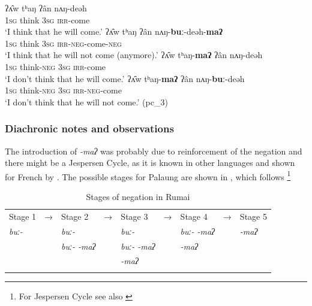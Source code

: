 \documentclass[output=paper,colorlinks,citecolor=brown]{langscibook}
\begin{document}
\ea\label{ex:rum:77}
    \ea\label{ex:rum:77a}
        \gll ʔʌ̂w	tʰaŋ	ʔân	nʌŋ-deəh \\ 
             \textsc{1sg} think 3\textsc{sg} \textsc{irr}{}-come \\
        \glt ‘I think that he will come.’
    \ex\label{ex:rum:77b}
        \gll ʔʌ̂w	tʰaŋ	ʔân	nʌŋ-\textbf{buː}-deəh-\textbf{maʔ} \\
             \textsc{1sg} think \textsc{3sg} \textsc{irr}{}-\textsc{neg}{}-come-\textsc{neg} \\
        \glt ‘I think that he will not come (anymore).’
    \ex\label{ex:rum:77c}
        \gll ʔʌ̂w	tʰaŋ-\textbf{maʔ}	ʔân	nʌŋ-deəh \\
             \textsc{1sg} think-\textsc{neg} \textsc{3sg} \textsc{irr}{}-come \\
        \glt ‘I don’t think that he will come.’
    \ex\label{ex:rum:77d}
        \gll ʔʌ̂w	tʰaŋ-\textbf{maʔ}	ʔân	nʌŋ-\textbf{buː}-deəh \\
             \textsc{1sg} think-\textsc{neg} \textsc{3sg} \textsc{irr}{}-\textsc{neg}{}-come \\
        \glt ‘I don’t think that he will not come.’ (pc\_3)
    \z
\z 

\subsubsection{Diachronic notes and observations} \label{sec:rum:4.6.2}

The introduction of \textit{{}-maʔ} was probably due to reinforcement of the negation and there might be a Jespersen Cycle, as it is known in other languages and shown for French by \citet[78--79]{Auwera2010}. The possible stages for Palaung are shown in , which follows \citet[79]{Auwera2010}\footnote{For Jespersen Cycle see also \citet{Jespersen2025}}

\begin{table}
\begin{tabularx}{\textwidth}{Xllllllll}
\lsptoprule
{Stage 1}       & {→} & {Stage 2}               & {→} & {Stage 3}             & {→} & {Stage 4}              & {→}   & {Stage 5}\\
{\itshape buː-} &     & {\itshape buː-}         &     & {\itshape buː-}       &     & {\itshape buː- {}-maʔ} &    & {\itshape {}-maʔ} \\
                &     & {\itshape buː- {}-maʔ}  &     & {\itshape buː- {}-maʔ}&     & {\itshape {}-maʔ}      &       &\\
                &     &                         &     & {\itshape {}-maʔ}     &     &                        &       &\\
\lspbottomrule
\end{tabularx}
\caption{Stages of negation in Rumai}
\label{tab:rum:5}
\end{table}
\end{document}
